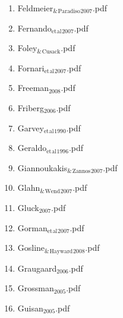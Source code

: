\documentclass[11pt]{article}
\begin{document}
\begin{enumerate}
\begin{enumerate}
\item Feldmeier$_{\text{\&}}$$_{\text{Paradiso}}$$_{\text{2007}}$.pdf
\label{sec-1-1-1-1-11-19-17-48}

\item Fernando$_{\text{et}}$$_{\text{al}}$$_{\text{2007}}$.pdf
\label{sec-1-1-1-1-11-19-17-49}

\item Foley$_{\text{\&}}$$_{\text{Cusack}}$.pdf
\label{sec-1-1-1-1-11-19-17-50}

\item Fornari$_{\text{et}}$$_{\text{al}}$$_{\text{2007}}$.pdf
\label{sec-1-1-1-1-11-19-17-51}

\item Freeman$_{\text{2008}}$.pdf
\label{sec-1-1-1-1-11-19-17-52}

\item Friberg$_{\text{2006}}$.pdf
\label{sec-1-1-1-1-11-19-17-53}

\item Garvey$_{\text{et}}$$_{\text{al}}$$_{\text{1990}}$.pdf
\label{sec-1-1-1-1-11-19-17-54}

\item Geraldo$_{\text{et}}$$_{\text{al}}$$_{\text{1996}}$.pdf
\label{sec-1-1-1-1-11-19-17-55}

\item Giannoukakis$_{\text{\&}}$$_{\text{Zannos}}$$_{\text{2007}}$.pdf
\label{sec-1-1-1-1-11-19-17-56}

\item Glahn$_{\text{\&}}$$_{\text{Wend}}$$_{\text{2007}}$.pdf
\label{sec-1-1-1-1-11-19-17-57}

\item Gluck$_{\text{2007}}$.pdf
\label{sec-1-1-1-1-11-19-17-58}

\item Gorman$_{\text{et}}$$_{\text{al}}$$_{\text{2007}}$.pdf
\label{sec-1-1-1-1-11-19-17-59}

\item Gosline$_{\text{\&}}$$_{\text{Hayward}}$$_{\text{2008}}$.pdf
\label{sec-1-1-1-1-11-19-17-60}

\item Graugaard$_{\text{2006}}$.pdf
\label{sec-1-1-1-1-11-19-17-61}

\item Grossman$_{\text{2005}}$.pdf
\label{sec-1-1-1-1-11-19-17-62}

\item Guisan$_{\text{2005}}$.pdf
\label{sec-1-1-1-1-11-19-17-63}


\end{enumerate}
\end{enumerate}
\end{document}
